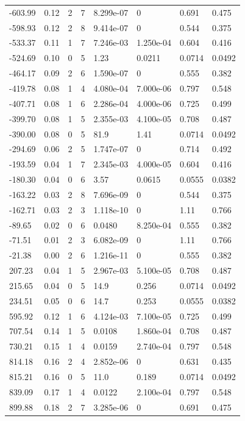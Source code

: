 \documentclass[preview]{standalone}
\begin{document}
{{\begin{tabular}{L{1.2cm}C{1.2cm} C{0.3cm}C{0.5cm} C{1.4cm}C{1.4cm} C{1.4cm}C{1.4cm}}
  -603.99  &  0.12  & 2     &  7 &  8.299e-07  & 0  & 0.691 &  0.475   \\ 
  -598.93  &  0.12  & 2     &  8 &  9.414e-07  & 0  & 0.544 &  0.375   \\ 
  -533.37  &  0.11  & 1     &  7 &  7.246e-03  & 1.250e-04  & 0.604 &  0.416   \\ 
  -524.69  &  0.10  & 0     &  5 &  1.23  & 0.0211  & 0.0714 &  0.0492   \\ 
  -464.17  &  0.09  & 2     &  6 &  1.590e-07  & 0  & 0.555 &  0.382   \\ 
  -419.78  &  0.08  & 1     &  4 &  4.080e-04  & 7.000e-06  & 0.797 &  0.548   \\ 
  -407.71  &  0.08  & 1     &  6 &  2.286e-04  & 4.000e-06  & 0.725 &  0.499   \\ 
  -399.70  &  0.08  & 1     &  5 &  2.355e-03  & 4.100e-05  & 0.708 &  0.487   \\ 
  -390.00  &  0.08  & 0     &  5 &  81.9  & 1.41  & 0.0714 &  0.0492   \\ 
  -294.69  &  0.06  & 2     &  5 &  1.747e-07  & 0  & 0.714 &  0.492   \\ 
  -193.59  &  0.04  & 1     &  7 &  2.345e-03  & 4.000e-05  & 0.604 &  0.416   \\ 
  -180.30  &  0.04  & 0     &  6 &  3.57  & 0.0615  & 0.0555 &  0.0382   \\ 
  -163.22  &  0.03  & 2     &  8 &  7.696e-09  & 0  & 0.544 &  0.375   \\ 
  -162.71  &  0.03  & 2     &  3 &  1.118e-10  & 0  & 1.11 &  0.766   \\ 
  -89.65  &  0.02  & 0     &  6 &  0.0480  & 8.250e-04  & 0.555 &  0.382   \\ 
  -71.51  &  0.01  & 2     &  3 &  6.082e-09  & 0  & 1.11 &  0.766   \\ 
  -21.38  &  0.00  & 2     &  6 &  1.216e-11  & 0  & 0.555 &  0.382   \\ 
  207.23  &  0.04  & 1     &  5 &  2.967e-03  & 5.100e-05  & 0.708 &  0.487   \\ 
  215.65  &  0.04  & 0     &  5 &  14.9  & 0.256  & 0.0714 &  0.0492   \\ 
  234.51  &  0.05  & 0     &  6 &  14.7  & 0.253  & 0.0555 &  0.0382   \\ 
  595.92  &  0.12  & 1     &  6 &  4.124e-03  & 7.100e-05  & 0.725 &  0.499   \\ 
  707.54  &  0.14  & 1     &  5 &  0.0108  & 1.860e-04  & 0.708 &  0.487   \\ 
  730.21  &  0.15  & 1     &  4 &  0.0159  & 2.740e-04  & 0.797 &  0.548   \\ 
  814.18  &  0.16  & 2     &  4 &  2.852e-06  & 0  & 0.631 &  0.435   \\ 
  815.21  &  0.16  & 0     &  5 &  11.0  & 0.189  & 0.0714 &  0.0492   \\ 
  839.09  &  0.17  & 1     &  4 &  0.0122  & 2.100e-04  & 0.797 &  0.548   \\ 
  899.88  &  0.18  & 2     &  7 &  3.285e-06  & 0  & 0.691 &  0.475   \\ 
\hline 
\end{tabular} 

}}
\end{document}
